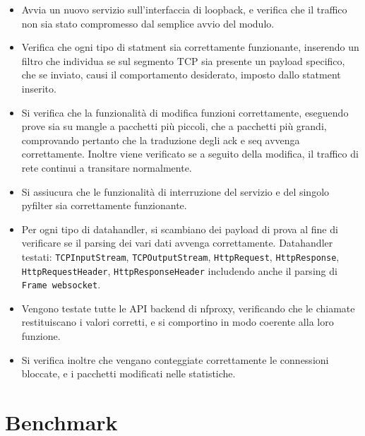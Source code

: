 \begin{itemize}
    \setlength{\itemsep}{2pt}
    \setlength{\parskip}{2pt}
    \item Avvia un nuovo servizio sull'interfaccia di loopback, e verifica che il traffico non sia stato compromesso dal semplice avvio del modulo.
    \item Verifica che ogni tipo di statment sia correttamente funzionante, inserendo un filtro che individua se sul segmento TCP sia presente un payload specifico, che se inviato, causi il comportamento desiderato, imposto dallo statment inserito.
    \item Si verifica che la funzionalità di modifica funzioni correttamente, eseguendo prove sia su mangle a pacchetti più piccoli, che a pacchetti più grandi, comprovando pertanto che la traduzione degli ack e seq avvenga correttamente. Inoltre viene verificato se a seguito della modifica, il traffico di rete continui a transitare normalmente.
    \item Si assiucura che le funzionalità di interruzione del servizio e del singolo pyfilter sia correttamente funzionante.
    \item Per ogni tipo di datahandler, si scambiano dei payload di prova al fine di verificare se il parsing dei vari dati avvenga correttamente. Datahandler testati: \texttt{TCPInputStream}, \texttt{TCPOutputStream}, \texttt{HttpRequest}, \texttt{HttpResponse}, \texttt{HttpRequestHeader},
    \texttt{HttpResponseHeader} includendo anche il parsing di \texttt{Frame websocket}.
    \item Vengono testate tutte le API backend di nfproxy, verificando che le chiamate restituiscano i valori corretti, e si comportino in modo coerente alla loro funzione.
    \item Si verifica inoltre che vengano conteggiate correttamente le connessioni bloccate, e i pacchetti modificati nelle statistiche.
\end{itemize}

\section{Benchmark}

